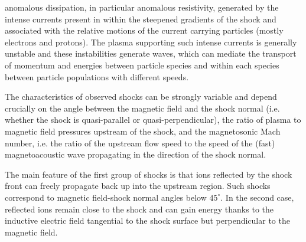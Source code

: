 \documentclass[12pt,a4paper]{article}
\begin{document}
anomalous dissipation, in particular anomalous resistivity, generated by the intense currents present in within the steepened gradients of the shock and associated with the relative motions of the current carrying particles (mostly electrons and protons). The plasma supporting such intense currents is generally unstable and these instabilities generate waves, which can mediate the transport of momentum and energies between particle species and within each species between particle populations with different speeds. 

The characteristics of observed shocks can be strongly variable and depend crucially on the angle between the magnetic field and the shock normal (i.e. whether the shock is quasi-parallel or quasi-perpendicular), the ratio of plasma to magnetic field pressures upstream of the shock, and the magnetosonic Mach number, i.e. the ratio of the upstream flow speed to the speed of the (fast) magnetoacoustic wave propagating in the direction of the shock normal. 

The main feature of the first group of shocks is that ions reflected by the shock front can freely propagate back up into the upstream region. Such shocks correspond to magnetic field-shock normal angles below $45^\circ$. In the second case, reflected ions remain close to the shock and can gain energy thanks to the inductive electric field tangential to the shock surface but perpendicular to the magnetic field.
\end{document}
